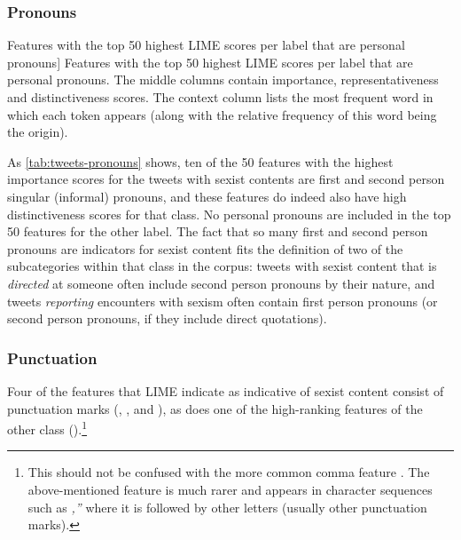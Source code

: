 \subsubsection{Pronouns}

\begin{table}[htbp]
    
    \caption
    [Features with the top 50 highest LIME scores per label that are personal pronouns]
    {Features with the top 50 highest LIME scores per label that are personal pronouns.
    The middle columns contain importance, representativeness and distinctiveness scores.
    The context column lists the most frequent word in which each token appears (along with the relative frequency of this word being the origin).
    }
    \label{tab:tweets-pronouns}
\end{table}

As \autoref{tab:tweets-pronouns} shows, ten of the 50 features with the highest importance scores for the tweets with sexist contents are first and second person singular (informal) pronouns, and these features do indeed also have high distinctiveness scores for that class.
No personal pronouns are included in the top 50 features for the other label.
The fact that so many first and second person pronouns are indicators for sexist content fits the definition of two of the subcategories within that class in the corpus: tweets with sexist content that is \textit{directed} at someone often include second person pronouns by their nature, and tweets \textit{reporting} encounters with sexism often contain first person pronouns (or second person pronouns, if they include direct quotations).

\subsubsection{Punctuation}

Four of the features that LIME indicate as indicative of sexist content consist of punctuation marks (, , \ngram{=\eow} and ), as does one of the high-ranking features of the other class (\ngram{,\mow}).\footnote{%
This should not be confused with the more common comma feature \ngram{,\eow}.
The above-mentioned feature is much rarer and appears in character sequences such as \textit{,''} where it is followed by other letters (usually other punctuation marks).
}
